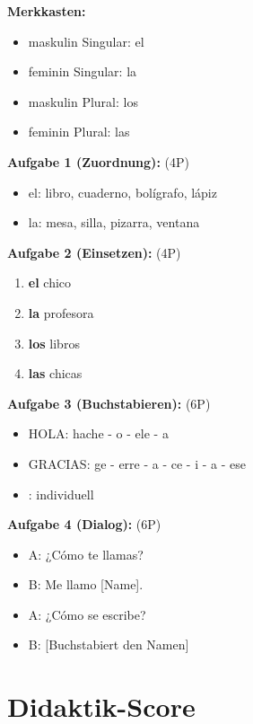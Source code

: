 \documentclass[11pt,a4paper]{article}
\begin{document}
\textbf{Merkkasten:}
\begin{itemize}
    \item maskulin Singular: el
    \item feminin Singular: la
    \item maskulin Plural: los
    \item feminin Plural: las
\end{itemize}

\textbf{Aufgabe 1 (Zuordnung):} (4P)
\begin{itemize}
    \item el: libro, cuaderno, bolígrafo, lápiz
    \item la: mesa, silla, pizarra, ventana
\end{itemize}

\textbf{Aufgabe 2 (Einsetzen):} (4P)
\begin{enumerate}[label=\alph*)]
    \item \textbf{el} chico
    \item \textbf{la} profesora
    \item \textbf{los} libros
    \item \textbf{las} chicas
\end{enumerate}

\textbf{Aufgabe 3 (Buchstabieren):} (6P)
\begin{itemize}
    \item HOLA: hache - o - ele - a
    \item GRACIAS: ge - erre - a - ce - i - a - ese
    \item [eigener Name]: individuell
\end{itemize}

\textbf{Aufgabe 4 (Dialog):} (6P)
\begin{itemize}
    \item A: ¿Cómo te llamas?
    \item B: Me llamo [Name].
    \item A: ¿Cómo se escribe?
    \item B: [Buchstabiert den Namen]
\end{itemize}

\newpage
\section{Didaktik-Score}
\end{document}
